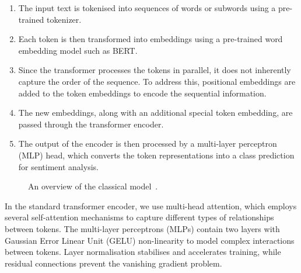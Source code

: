 \begin{enumerate}
    \setlength{
  \itemsep}{-1ex}
  \item The input text is tokenised into sequences of words or
    subwords using a pre-trained tokenizer.
  \item Each token is then transformed into embeddings using a
    pre-trained word embedding model such as BERT.
  \item Since the transformer processes the tokens in parallel, it
    does not inherently capture the order of the sequence. To address
    this, positional embeddings are added to the token embeddings to
    encode the sequential information.
  \item The new embeddings, along with an additional special token
    embedding, are passed through the transformer encoder.
  \item The output of the encoder is then processed by a multi-layer
    perceptron (MLP) head, which converts the token representations
    into a class prediction for sentiment analysis.
\end{enumerate}

\begin{figure}[ht]
  \begin{center} 
  \end{center} \vspace{-0.5cm} \caption{An overview of the classical
  model~\cite{dosovitskiy2021image}.}
  \label{fig:vit_architecture}
\end{figure}

In the standard transformer encoder, we use multi-head attention,
which employs several self-attention mechanisms to capture different
types of relationships between tokens. The multi-layer perceptrons
(MLPs) contain two layers with Gaussian Error Linear Unit (GELU)
non-linearity to model complex interactions between tokens. Layer
normalisation stabilises and accelerates training, while residual
connections prevent the vanishing gradient problem.

